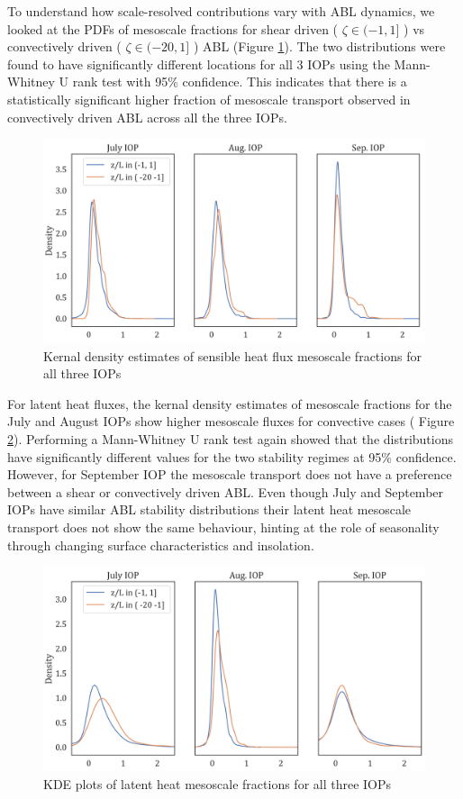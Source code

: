 \documentclass[draft]{agujournal2019}
\begin{document}
To understand how scale-resolved contributions vary with ABL dynamics, we looked at the PDFs of mesoscale fractions for shear driven ( $\zeta \in (-1,1]$  ) vs convectively driven ( $\zeta \in (-20,1]$  ) ABL (Figure \ref{fig:KDE_H_IOP}). The two distributions were found to have significantly different locations for all 3 IOPs using the Mann-Whitney U rank test with 95\% confidence. This indicates that there is a statistically significant higher fraction of mesoscale transport observed in convectively driven ABL across all the three IOPs.
\begin{figure}[hbtp]
 \noindent\includegraphics[width=\textwidth]{KDE_H_IOP.png}
\caption{ Kernal density estimates of sensible heat flux mesoscale fractions for all three IOPs}
\label{fig:KDE_H_IOP}
\end{figure}

For latent heat fluxes, the kernal density estimates of mesoscale fractions for the July and August IOPs show higher mesoscale fluxes for convective cases ( Figure \ref{fig:KDE_LE_IOP}). Performing a Mann-Whitney U rank test again showed that the distributions have significantly different values for the two stability regimes at 95\% confidence. However, for September IOP the mesoscale transport does not have a preference between a shear or convectively driven ABL. Even though July and September IOPs have similar ABL stability distributions their latent heat mesoscale transport does not show the same behaviour, hinting at the role of seasonality through changing surface characteristics and insolation. \begin{figure}[hbtp]
 \noindent\includegraphics[width=\textwidth]{KDE_LE_IOP.png}
\caption{ KDE plots of latent heat mesoscale fractions for all three IOPs}
\label{fig:KDE_LE_IOP}
\end{figure}
\end{document}
